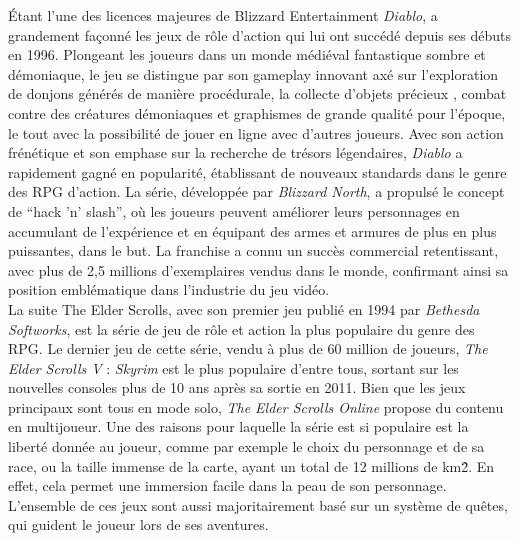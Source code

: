 


Étant l’une des licences majeures de Blizzard Entertainment \textit{Diablo}, a grandement façonné les jeux de rôle d'action qui lui ont succédé depuis ses débuts en 1996. 
Plongeant les joueurs dans un monde médiéval fantastique sombre et démoniaque, le jeu se distingue par son gameplay innovant axé sur l'exploration de donjons générés de manière procédurale, la collecte d'objets précieux , combat contre des créatures démoniaques et graphismes de grande qualité pour l’époque, le tout avec la possibilité de jouer en ligne avec d’autres joueurs. 
Avec son action frénétique et son emphase sur la recherche de trésors légendaires, \textit{Diablo} a rapidement gagné en popularité, établissant de nouveaux standards dans le genre des RPG d'action. 
La série, développée par \textit{Blizzard North}, a propulsé le concept de “hack 'n' slash”, où les joueurs peuvent améliorer leurs personnages en accumulant de l'expérience et en équipant des armes et armures de plus en plus puissantes, dans le but. 
La franchise a connu un succès commercial retentissant, avec plus de 2,5 millions d'exemplaires vendus dans le monde, confirmant ainsi sa position emblématique dans l'industrie du jeu vidéo.
\\

La suite The Elder Scrolls, avec son premier jeu publié en 1994 par \textit{Bethesda Softworks}, est la série de jeu de rôle et action la plus populaire du genre des RPG. 
Le dernier jeu de cette série, vendu à plus de 60 million de joueurs, \textit{The Elder Scrolls V} : \textit{Skyrim} est le plus populaire d'entre tous, sortant sur les nouvelles consoles plus de 10 ans après sa sortie en 2011. 
Bien que les jeux principaux sont tous en mode solo, \textit{The Elder Scrolls Online} propose du contenu en multijoueur. 
Une des raisons pour laquelle la série est si populaire est la liberté donnée au joueur, comme par exemple le choix du personnage et de sa race, ou la taille immense de la carte, ayant un total de 12 millions de km\^{2}. 
En effet, cela permet une immersion facile dans la peau de son personnage. 
L'ensemble de ces jeux sont aussi majoritairement basé sur un système de quêtes, qui guident le joueur lors de ses aventures.
\\

